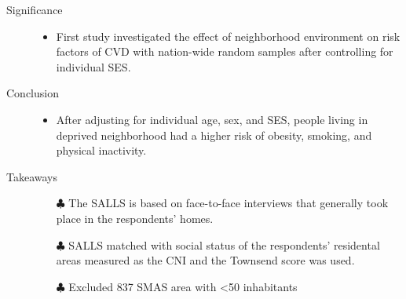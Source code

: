 \documentclass{article}
\begin{document}
\begin{itemize}
\begin{description}
			\item[Significance] \mbox{}\par
				\begin{itemize}
					\item First study investigated the effect of neighborhood environment on risk factors of CVD with nation-wide random samples after controlling for individual SES. 
				\end{itemize}
			\item[Conclusion] \mbox{}\par
				\begin{itemize}
					\item After adjusting for individual age, sex, and SES, people living in deprived neighborhood had a higher risk of obesity, smoking, and physical inactivity.
				\end{itemize}
			\item[Takeaways] \mbox{}\par
				\begin{itemize}
					\item[$\clubsuit$] The SALLS is based on face-to-face interviews that generally took place in the respondents' homes.
					\item[$\clubsuit$] SALLS matched with social status of the respondents' residental areas measured as the CNI and the Townsend score was used.
					\item[$\clubsuit$] Excluded 837 SMAS area with <50 inhabitants
				\end{itemize}
		\end{description}


\end{itemize}
\end{document}
